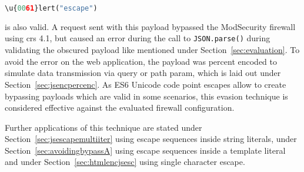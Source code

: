 \begin{lstlisting}[style=basicStyle, language=Python, caption=\textbackslash u\{0061\}lert('escape') bypass]
\u{0061}lert("escape")
\end{lstlisting}

is also valid. A request sent with this payload bypassed the ModSecurity firewall using \acrshort{crs} 4.1, but caused an error during the call to \verb|JSON.parse()| during validating the obscured payload like mentioned under Section~\ref{sec:evaluation}. 
To avoid the error on the web application, the payload was percent encoded to simulate data transmission via query or path param, which is laid out under Section~\ref{sec:jsencpercenc}. As ES6 Unicode code point escapes allow to create bypassing payloads which are valid in some scenarios, this evasion technique is considered effective against the evaluated firewall configuration.

Further applications of this technique are stated under Section~\ref{sec:jsescapemultiiter} using escape sequences inside string literals, under Section~\ref{sec:avoidingbypassA} using escape sequences inside a template literal and under Section~\ref{sec:htmlencjsesc} using single character escape.

%
%
%

